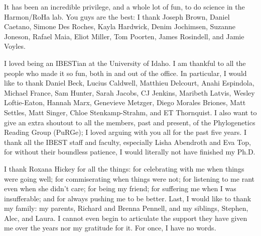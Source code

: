 It has been an incredible privilege, and a whole lot of fun, to do science in the Harmon/RoHa lab. You guys are the best: I thank Joseph Brown, Daniel Caetano, Simone Des Roches, Kayla Hardwick, Denim Jochimsen, Suzanne Joneson, Rafael Maia, Eliot Miller, Tom Poorten, James Rosindell, and Jamie Voyles.

I loved being an IBESTian at the University of Idaho. I am thankful to all the people who made it so fun, both in and out of the office. In particular, I would like to thank Daniel Beck, Lucius Caldwell, Matthieu Delcourt, Anahi Espindola, Michael France, Sam Hunter, Sarah Jacobs, CJ Jenkins, Maribeth Latvis, Wesley Loftie-Eaton, Hannah Marx, Genevieve Metzger, Diego Morales Briones, Matt Settles, Matt Singer, Chloe Stenkamp-Strahm, and ET Thornquist. I also want to give an extra shoutout to all the members, past and present, of the Phylogenetics Reading Group (PuRGe); I loved arguing with you all for the past five years. I thank all the IBEST staff and faculty, especially Lisha Abendroth and Eva Top, for without their boundless patience, I would literally not have finished my Ph.D.

I thank Roxana Hickey for all the things: for celebrating with me when things were going well; for commiserating when things were not; for listening to me rant even when she didn't care; for being my friend; for suffering me when I was insufferable; and for always pushing me to be better. Last, I would like to thank my family: my parents, Richard and Brenna Pennell, and my siblings, Stephen, Alec, and Laura. I cannot even begin to articulate the support they have given me over the years nor my gratitude for it. For once, I have no words.


